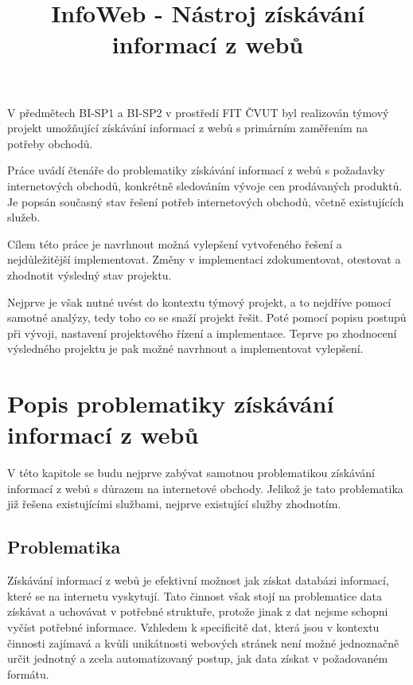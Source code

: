 \documentclass[thesis=B,czech]{FITthesis}[2012/06/26]
\title{ InfoWeb - Nástroj získávání informací z webů }
\begin{document}

\begin{introduction}
V předmětech BI-SP1 a BI-SP2 v prostředí FIT ČVUT byl realizován týmový projekt umožňující získávání informací z webů s primárním zaměřením na potřeby obchodů.
\par
Práce uvádí čtenáře do problematiky získávání informací z webů s požadavky internetových obchodů, konkrétně sledováním
vývoje cen prodávaných produktů. Je popsán současný stav řešení potřeb internetových obchodů, včetně existujících služeb.
\par
Cílem této práce je navrhnout možná vylepšení vytvořeného řešení a nejdůležitější implementovat. Změny v implementaci zdokumentovat, 
otestovat a zhodnotit výsledný stav projektu.
\par
Nejprve je však nutné uvést do kontextu týmový projekt, a to nejdříve pomocí samotné analýzy, tedy toho co se snaží projekt řešit.
Poté pomocí popisu postupů při vývoji, nastavení projektového řízení a implementace.
Teprve po zhodnocení výsledného projektu je pak možné navrhnout a implementovat vylepšení.

\newpage

\end{introduction}


\chapter{Popis problematiky získávání informací z webů}

V této kapitole se budu nejprve zabývat samotnou problematikou získávání informací 
z webů s důrazem na internetové obchody.
Jelikož je tato problematika již řešena existujícími službami, nejprve existující služby zhodnotím.

\section{Problematika}
Získávání informací z webů je efektivní možnost jak získat databázi informací, které se na internetu vyskytují.
Tato činnost však stojí na problematice data získávat a uchovávat v potřebné struktuře, protože 
jinak z dat nejsme schopni vyčíst potřebné informace.
Vzhledem k specificitě dat, která jsou v kontextu činnosti zajímavá a kvůli unikátnosti webových stránek
není možné jednoznačně určit jednotný a zcela automatizovaný postup, jak data získat v požadovaném formátu.
\end{document}

